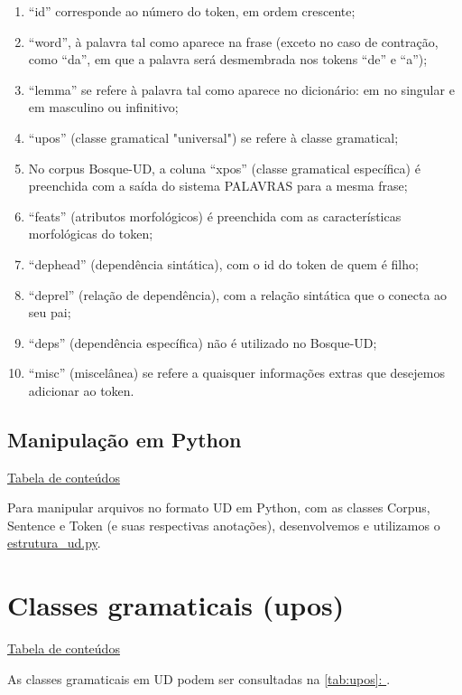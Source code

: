 \documentclass[output=paper,colorlinks,citecolor=brown]{langscibook}
\newcommand*{\fullref}[1]{\hyperref[{#1}]{\autoref*{#1}: \nameref*{#1}}} %
\begin{document}
\begin{enumerate}
    \item “id” corresponde ao número do token, em ordem crescente;
    \item “word”, à palavra tal como aparece na frase (exceto no caso de contração, como “da”, em que a palavra será desmembrada nos tokens “de” e “a”);
    \item “lemma” se refere à palavra tal como aparece no dicionário: em no singular e em masculino ou infinitivo;
    \item “upos” (classe gramatical "universal") se refere à classe gramatical;
    \item No corpus Bosque-UD, a coluna “xpos” (classe gramatical específica) é preenchida com a saída do sistema PALAVRAS para a mesma frase;
    \item “feats” (atributos morfológicos) é preenchida com as características morfológicas do token;
    \item “dephead” (dependência sintática), com o id do token de quem é filho;
    \item “deprel” (relação de dependência), com a relação sintática que o conecta ao seu pai;
    \item “deps” (dependência específica) não é utilizado no Bosque-UD;
    \item “misc” (miscelânea) se refere a quaisquer informações extras que desejemos adicionar ao token.
\end{enumerate}{}

\section{Manipulação em Python}\label{sec:python}

\hyperlink{toc}{Tabela de conteúdos\\}

Para manipular arquivos no formato UD em Python, com as classes Corpus, Sentence e Token (e suas respectivas anotações), desenvolvemos e utilizamos o \href{https://github.com/alvelvis/ACDC-UD/blob/master/estrutura_ud.py}{estrutura\_ud.py}.

\chapter{Classes gramaticais (upos)}\label{sec:upos}

\hyperlink{toc}{Tabela de conteúdos\\}

As classes gramaticais em UD podem ser consultadas na \fullref{tab:upos}.
\end{document}
